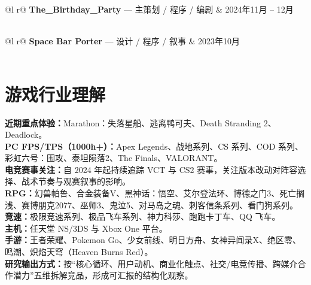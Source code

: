 \documentclass[a4paper,12pt]{article}
\begin{document}
\vspace{4pt}

\begin{tabularx}{\linewidth}{@{}l r@{}}
\textbf{The\_Birthday\_Party} --- 主策划 / 程序 / 编剧 & \hfill 2024年11月 -- 12月 \\
\\
\end{tabularx}

\vspace{4pt}

\begin{tabularx}{\linewidth}{@{}l r@{}}
\textbf{Space Bar Porter} --- 设计 / 程序 / 叙事 & \hfill 2023年10月 \\
\\
\end{tabularx}

\section{游戏行业理解}
\textbf{近期重点体验：}Marathon：失落星船、逃离鸭可夫、Death Stranding 2、Deadlock。\\
\textbf{PC FPS/TPS（1000h+）：}Apex Legends、战地系列、CS 系列、COD 系列、彩虹六号：围攻、泰坦陨落2、The Finals、VALORANT。\\
\textbf{电竞赛事关注：}自 2024 年起持续追踪 VCT 与 CS2 赛事，关注版本改动对阵容选择、战术节奏与观赛叙事的影响。\\
\textbf{RPG：}幻兽帕鲁、合金装备V、黑神话：悟空、艾尔登法环、博德之门3、死亡搁浅、赛博朋克2077、巫师3、鬼泣5、对马岛之魂、刺客信条系列、看门狗系列。\\
\textbf{竞速：}极限竞速系列、极品飞车系列、神力科莎、跑跑卡丁车、QQ 飞车。\\
\textbf{主机：}任天堂 NS/3DS 与 Xbox One 平台。\\
\textbf{手游：}王者荣耀、Pokemon Go、少女前线、明日方舟、女神异闻录X、绝区零、鸣潮、炽焰天穹（Heaven Burns Red）。\\
\textbf{研究输出方式：}按“核心循环、用户动机、商业化触点、社交/电竞传播、跨媒介合作潜力”五维拆解竞品，形成可汇报的结构化观察。
\end{document}

